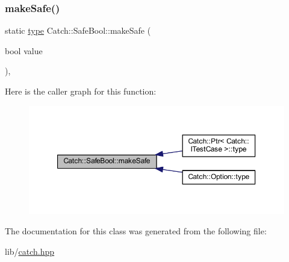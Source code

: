 \subsubsection{\texorpdfstring{make\+Safe()}{makeSafe()}}
{\footnotesize\ttfamily static \hyperlink{class_catch_1_1_safe_bool_a39eef9baed296299d625a54d54a2a958}{type} Catch\+::\+Safe\+Bool\+::make\+Safe (\begin{DoxyParamCaption}\item[{bool}]{value }\end{DoxyParamCaption})\hspace{0.3cm}{\ttfamily [inline]}, {\ttfamily [static]}}

Here is the caller graph for this function\+:\nopagebreak
\begin{figure}[H]
\begin{center}
\leavevmode
\includegraphics[width=350pt]{class_catch_1_1_safe_bool_af0ea63d9820f8bf7a8b76377913c4e77_icgraph}
\end{center}
\end{figure}


The documentation for this class was generated from the following file\+:\begin{DoxyCompactItemize}
\item 
lib/\hyperlink{catch_8hpp}{catch.\+hpp}\end{DoxyCompactItemize}
